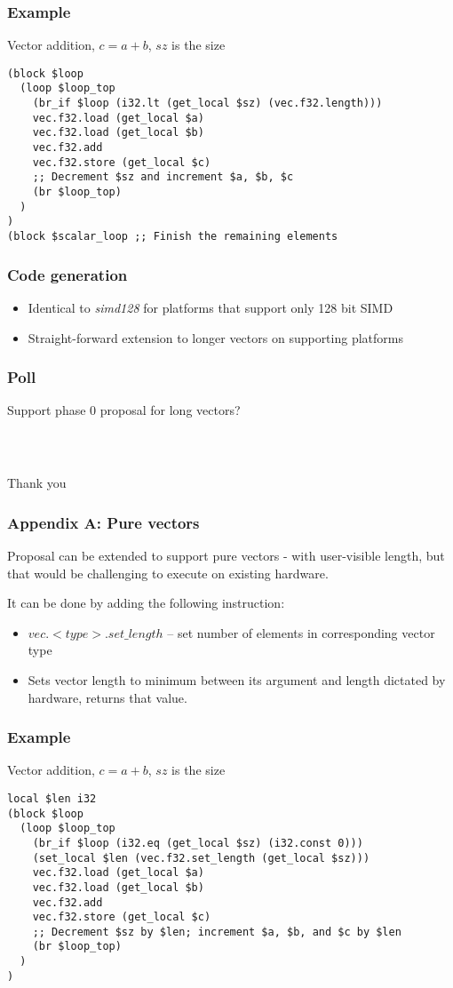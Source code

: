 \documentclass[t,aspectratio=169, xcolor={table}]{beamer}
\begin{document}
\begin{frame}[containsverbatim]
\frametitle{Example}
Vector addition, $c = a + b$, $sz$ is the size
\begin{lstlisting}
(block $loop
  (loop $loop_top
    (br_if $loop (i32.lt (get_local $sz) (vec.f32.length)))
    vec.f32.load (get_local $a)
    vec.f32.load (get_local $b)
    vec.f32.add
    vec.f32.store (get_local $c)
    ;; Decrement $sz and increment $a, $b, $c
    (br $loop_top)
  )
)
(block $scalar_loop ;; Finish the remaining elements
\end{lstlisting}
\end{frame}
\begin{frame}
\frametitle{Code generation}
  \begin{itemize}
  \item Identical to \textit{simd128} for platforms that support only 128 bit SIMD
  \item Straight-forward extension to longer vectors on supporting platforms
  \end{itemize}
\end{frame}
\begin{frame}
\frametitle{Poll}
Support phase 0 proposal for long vectors?
\end{frame}
\begin{frame}
\frametitle{~}
\huge{Thank you}
\end{frame}
\begin{frame}
\frametitle{Appendix A: Pure vectors}
  Proposal can be extended to support pure vectors - with user-visible length, but that would be challenging to execute on existing hardware.

  It can be done by adding the following instruction:

  \begin{itemize}
  \item $vec.<type>.set\_length$ -- set number of elements in corresponding vector type
  \item[] Sets vector length to minimum between its argument and length dictated by hardware, returns that value.
  \end{itemize}
\end{frame}
\begin{frame}[containsverbatim]
\frametitle{Example}
Vector addition, $c = a + b$, $sz$ is the size
\begin{lstlisting}
local $len i32
(block $loop
  (loop $loop_top
    (br_if $loop (i32.eq (get_local $sz) (i32.const 0)))
    (set_local $len (vec.f32.set_length (get_local $sz)))
    vec.f32.load (get_local $a)
    vec.f32.load (get_local $b)
    vec.f32.add
    vec.f32.store (get_local $c)
    ;; Decrement $sz by $len; increment $a, $b, and $c by $len
    (br $loop_top)
  )
)
\end{lstlisting}
\end{frame}
\end{document}
